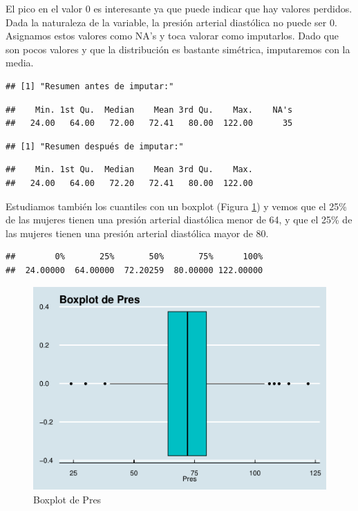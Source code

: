 \documentclass[
]{article}
\begin{document}
El pico en el valor 0 es interesante ya que puede indicar que hay
valores perdidos. Dada la naturaleza de la variable, la presión arterial
diastólica no puede ser 0. Asignamos estos valores como NA's y toca
valorar como imputarlos. Dado que son pocos valores y que la
distribución es bastante simétrica, imputaremos con la media.

\begin{verbatim}
## [1] "Resumen antes de imputar:"
\end{verbatim}

\begin{verbatim}
##    Min. 1st Qu.  Median    Mean 3rd Qu.    Max.    NA's 
##   24.00   64.00   72.00   72.41   80.00  122.00      35
\end{verbatim}

\begin{verbatim}
## [1] "Resumen después de imputar:"
\end{verbatim}

\begin{verbatim}
##    Min. 1st Qu.  Median    Mean 3rd Qu.    Max. 
##   24.00   64.00   72.20   72.41   80.00  122.00
\end{verbatim}

Estudiamos también los cuantiles con un boxplot (Figura
\ref{fig:box_pres}) y vemos que el 25\% de las mujeres tienen una
presión arterial diastólica menor de 64, y que el 25\% de las mujeres
tienen una presión arterial diastólica mayor de 80.

\begin{verbatim}
##        0%       25%       50%       75%      100% 
##  24.00000  64.00000  72.20259  80.00000 122.00000
\end{verbatim}

\begin{figure}

{\centering \includegraphics[width=0.5\linewidth]{pima-clasificacion_files/figure-latex/box_pres-1} 

}

\caption{Boxplot de Pres}\label{fig:box_pres}
\end{figure}
\end{document}
